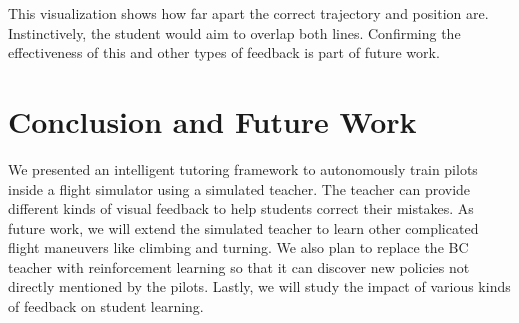 \documentclass[letterpaper]{article} %
\begin{document}
This visualization shows how far apart the correct trajectory and position are. Instinctively, the student would aim to overlap both lines. Confirming the effectiveness of this and other types of feedback is part of future work.
 
\section{Conclusion and Future Work}
We presented an intelligent tutoring framework to autonomously train pilots inside a flight simulator using a simulated teacher. The teacher can provide different kinds of visual feedback to help students correct their mistakes. As future work, we will extend the simulated teacher to learn other complicated flight maneuvers like climbing and turning. We also plan to replace the BC teacher with reinforcement learning so that it can discover new policies not directly mentioned by the pilots. Lastly, we will study the impact of various kinds of feedback on student learning.


\end{document}
